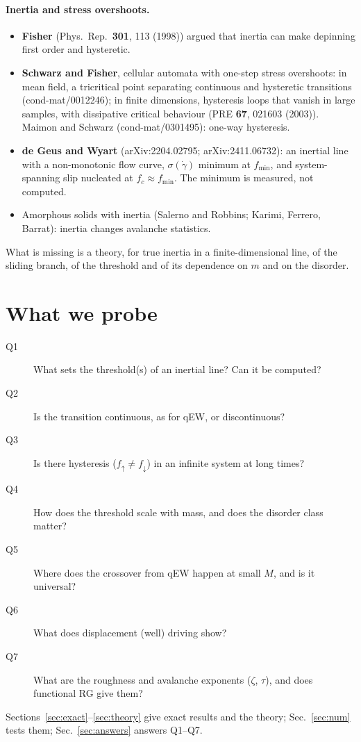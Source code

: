 \documentclass[10pt,a4paper]{article}
\newcommand{\fd}{f_\downarrow}
\newcommand{\fu}{f_\uparrow}
\begin{document}
\paragraph{Inertia and stress overshoots.}
\begin{itemize}
\item \textbf{Fisher} (Phys.\ Rep.\ \textbf{301}, 113 (1998)) argued that inertia can make depinning first order and hysteretic.
\item \textbf{Schwarz and Fisher}, cellular automata with one-step stress overshoots: in mean field, a tricritical point separating continuous and hysteretic transitions (cond-mat/0012246); in finite dimensions, hysteresis loops that vanish in large samples, with dissipative critical behaviour (PRE \textbf{67}, 021603 (2003)). Maimon and Schwarz (cond-mat/0301495): one-way hysteresis.
\item \textbf{de Geus and Wyart} (arXiv:2204.02795; arXiv:2411.06732): an inertial line with a non-monotonic flow curve, $\sigma(\dot\gamma)$ minimum at $f_{\min}$, and system-spanning slip nucleated at $f_c\approx f_{\min}$. The minimum is measured, not computed.
\item Amorphous solids with inertia (Salerno and Robbins; Karimi, Ferrero, Barrat): inertia changes avalanche statistics.
\end{itemize}
What is missing is a theory, for true inertia in a finite-dimensional line, of the sliding branch, of the threshold and of its dependence on $m$ and on the disorder.

\section{What we probe}
\label{sec:questions}

\begin{description}
\item[Q1] What sets the threshold(s) of an inertial line? Can it be computed?
\item[Q2] Is the transition continuous, as for qEW, or discontinuous?
\item[Q3] Is there hysteresis ($\fu\ne\fd$) in an infinite system at long times?
\item[Q4] How does the threshold scale with mass, and does the disorder class matter?
\item[Q5] Where does the crossover from qEW happen at small $M$, and is it universal?
\item[Q6] What does displacement (well) driving show?
\item[Q7] What are the roughness and avalanche exponents ($\zeta$, $\tau$), and does functional RG give them?
\end{description}
Sections~\ref{sec:exact}--\ref{sec:theory} give exact results and the theory; Sec.~\ref{sec:num} tests them; Sec.~\ref{sec:answers} answers Q1--Q7.
\end{document}
